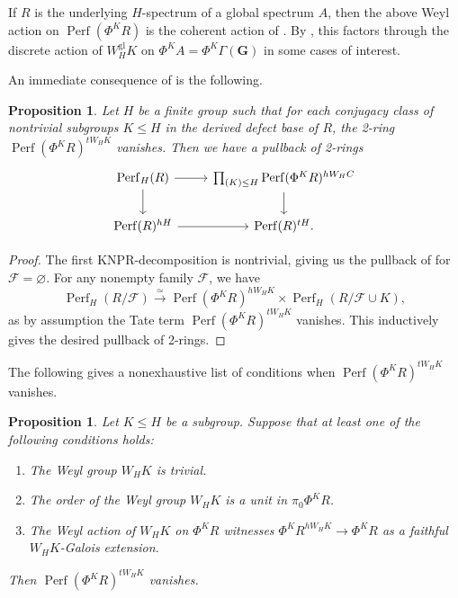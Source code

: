 \documentclass[11pt, a4paper]{article}
\newcommand{\gl}{\mathrm{gl}}
\newcommand{\1}{\mathbf{1}}
\DeclareMathOperator{\Perf}{Perf}
\newcommand{\calF}{\mathcal{F}}
\newcommand{\G}{\mathbf{G}}
\newcommand{\Ga}{\Gamma}
\theoremstyle{plain}
\newtheorem{prop}[equation]{Proposition}
\theoremstyle{definition}
\theoremstyle{remark}\numberwithin{equation}{section}
\begin{document}
If $R$ is the underlying $H$-spectrum of a global spectrum $A$, then the above Weyl action on $\Perf(\Phi^K R)$ is the coherent action of . By , this factors through the discrete action of $W_H^\gl K$ on $\Phi^K A=\Phi^K \Ga(\G)$ in some cases of interest.

An immediate consequence of  is the following.

\begin{prop}\label{pr:generic_decomposition}
    Let $H$ be a finite group such that for each conjugacy class of nontrivial subgroups $K\leq H$ in the derived defect base of $R$, the 2-ring $\Perf(\Phi^K R)^{tW_H K}$ vanishes. Then we have a pullback of 2-rings
    \[\begin{tikzcd}
        {\Perf_H(R)}\ar[r]\ar[d]    &   {\prod_{(K)\leq H} \Perf(\Phi^K R)^{hW_H C}}\ar[d]  \\
        {\Perf(R)^{hH}}\ar[r]   &   {\Perf(R)^{tH}.}
    \end{tikzcd}\]
\end{prop}

\begin{proof}
    The first KNPR-decomposition is nontrivial, giving us the pullback of  for $\calF = \varnothing$. For any nonempty family $\calF$, we have
    \[\Perf_H(R/\calF) \xrightarrow{\simeq} \Perf(\Phi^K R)^{hW_H K} \times \Perf_H(R/\calF \cup K),\]
    as by assumption the Tate term $\Perf(\Phi^K R)^{tW_H K}$ vanishes. This inductively gives the desired pullback of 2-rings.
\end{proof}

The following gives a nonexhaustive list of conditions when $\Perf(\Phi^K R)^{tW_H K}$ vanishes.

\begin{prop}\label{pr:generic_tate_vanishing}
    Let $K\leq H$ be a subgroup. Suppose that at least one of the following conditions holds:
    \begin{enumerate}
        \item The Weyl group $W_H K$ is trivial.
        \item The order of the Weyl group $W_H K$ is a unit in $\pi_0 \Phi^{K} R$.
        \item The Weyl action of $W_H K$ on $\Phi^K R$ witnesses $\Phi^K R^{hW_H K} \to \Phi^K R$ as a faithful $W_H K$-Galois extension.
    \end{enumerate}
    Then $\Perf(\Phi^K R)^{tW_H K}$ vanishes.
\end{prop}
\end{document}
